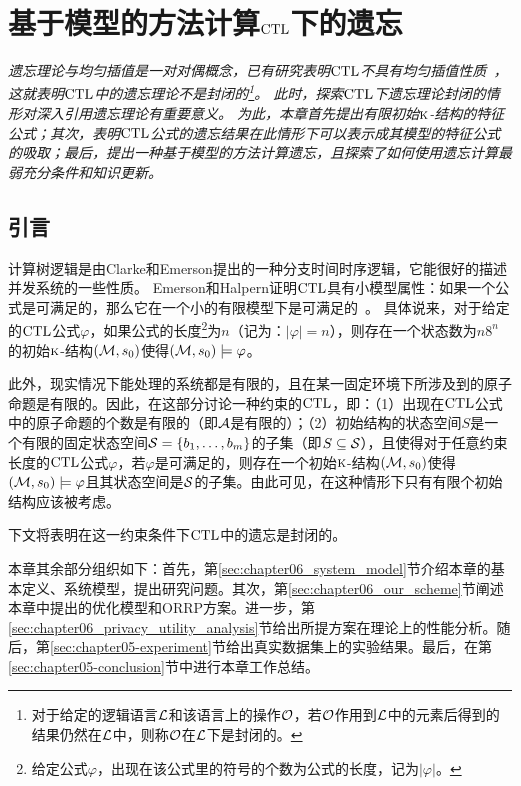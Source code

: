 \chapter{基于模型的方法计算$\textrm{CTL}$下的遗忘}\label{chapter05}

{\em
	遗忘理论与均匀插值是一对对偶概念，已有研究表明$\textrm{CTL}$不具有均匀插值性质~\cite{Maksimova:JANCL:1991}，这就表明$\textrm{CTL}$中的遗忘理论不是封闭的\footnote{对于给定的逻辑语言${\cal L}$和该语言上的操作${\cal O}$，若$\cal O$作用到$\cal L$中的元素后得到的结果仍然在$\cal L$中，则称$\cal O$在$\cal L$下是封闭的。}。
	此时，探索$\textrm{CTL}$下遗忘理论封闭的情形对深入引用遗忘理论有重要意义。
	为此，本章首先提出有限初始$\textsc{k}$-结构的特征公式；其次，表明$\textrm{CTL}$公式的遗忘结果在此情形下可以表示成其模型的特征公式的吸取；最后，提出一种基于模型的方法计算遗忘，且探索了如何使用遗忘计算最弱充分条件和知识更新。
}

\section{引言}\label{sec:chapter06_introduction}

计算树逻辑是由Clarke和Emerson提出的一种分支时间时序逻辑，它能很好的描述并发系统的一些性质。
Emerson和Halpern证明$\textrm{CTL}$具有小模型属性：如果一个公式是可满足的，那么它在一个小的有限模型下是可满足的~\cite{DBLP:journals/jcss/EmersonH85}。
具体说来，对于给定的$\textrm{CTL}$公式$\varphi$，如果公式的长度\footnote{给定公式$\varphi$，出现在该公式里的符号的个数为公式的长度，记为$|\varphi|$。}为$n$（记为：$|\varphi| = n$），则存在一个状态数为$n8^n$的初始$\textsc{k}$-结构$({\cal M},s_0)$使得$({\cal M},s_0)\models \varphi$。

此外，现实情况下能处理的系统都是有限的，且在某一固定环境下所涉及到的原子命题是有限的。因此，在这部分讨论一种约束的$\textrm{CTL}$，即：（1）出现在$\textrm{CTL}$公式中的原子命题的个数是有限的（即${\cal A}$是有限的）；（2）初始结构的状态空间$S$是一个有限的固定状态空间${\cal S}=\{b_1,\ldots,b_m\}$的子集（即$S \subseteq {\cal S}$），且使得对于任意约束长度的$\textrm{CTL}$公式$\varphi$，若$\varphi$是可满足的，则存在一个初始$\textsc{k}$-结构$({\cal M},s_0)$使得$({\cal M},s_0)\models \varphi$且其状态空间是${\cal S}$的子集。由此可见，在这种情形下只有有限个初始结构应该被考虑。

下文将表明在这一约束条件下$\textrm{CTL}$中的遗忘是封闭的。

本章其余部分组织如下：首先，第\ref{sec:chapter06_system_model}节介绍本章的基本定义、系统模型，提出研究问题。其次，第\ref{sec:chapter06_our_scheme}节阐述本章中提出的优化模型和ORRP方案。进一步，第\ref{sec:chapter06_privacy_utility_analysis}节给出所提方案在理论上的性能分析。随后，第\ref{sec:chapter05-experiment}节给出真实数据集上的实验结果。最后，在第\ref{sec:chapter05-conclusion}节中进行本章工作总结。

